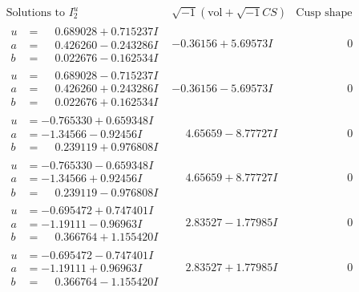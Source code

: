 \documentclass[1p]{elsarticle_modified}
\theoremstyle{definition}
\newcommand{\I}{\sqrt{-1}}
\begin{document}
$$\begin{array}{c|c|c}  
\text{Solutions to }I^u_{2}& \I (\text{vol} + \sqrt{-1}CS) & \text{Cusp shape}\\
 \hline 
\begin{aligned}
u &= \phantom{-}0.689028 + 0.715237 I \\
a &= \phantom{-}0.426260 - 0.243286 I \\
b &= \phantom{-}0.022676 - 0.162534 I\end{aligned}
 & -0.36156 + 5.69573 I & \phantom{-0.000000 } 0 \\ \hline\begin{aligned}
u &= \phantom{-}0.689028 - 0.715237 I \\
a &= \phantom{-}0.426260 + 0.243286 I \\
b &= \phantom{-}0.022676 + 0.162534 I\end{aligned}
 & -0.36156 - 5.69573 I & \phantom{-0.000000 } 0 \\ \hline\begin{aligned}
u &= -0.765330 + 0.659348 I \\
a &= -1.34566 - 0.92456 I \\
b &= \phantom{-}0.239119 + 0.976808 I\end{aligned}
 & \phantom{-}4.65659 - 8.77727 I & \phantom{-0.000000 } 0 \\ \hline\begin{aligned}
u &= -0.765330 - 0.659348 I \\
a &= -1.34566 + 0.92456 I \\
b &= \phantom{-}0.239119 - 0.976808 I\end{aligned}
 & \phantom{-}4.65659 + 8.77727 I & \phantom{-0.000000 } 0 \\ \hline\begin{aligned}
u &= -0.695472 + 0.747401 I \\
a &= -1.19111 - 0.96963 I \\
b &= \phantom{-}0.366764 + 1.155420 I\end{aligned}
 & \phantom{-}2.83527 - 1.77985 I & \phantom{-0.000000 } 0 \\ \hline\begin{aligned}
u &= -0.695472 - 0.747401 I \\
a &= -1.19111 + 0.96963 I \\
b &= \phantom{-}0.366764 - 1.155420 I\end{aligned}
 & \phantom{-}2.83527 + 1.77985 I & \phantom{-0.000000 } 0 \\ \hline\begin{aligned}

\end{aligned}
\end{array}$$
\end{document}
